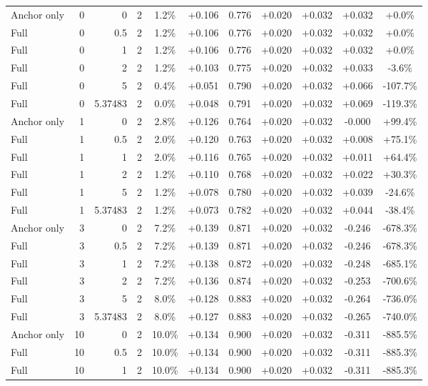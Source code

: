 \begin{table}[htbp]
\begin{tabular}{lrrrccccccc}
Anchor only & 0 & 0 & 2 & 1.2\% & +0.106 & 0.776 & +0.020 & +0.032 & +0.032 & +0.0\% \\
Full & 0 & 0.5 & 2 & 1.2\% & +0.106 & 0.776 & +0.020 & +0.032 & +0.032 & +0.0\% \\
Full & 0 & 1 & 2 & 1.2\% & +0.106 & 0.776 & +0.020 & +0.032 & +0.032 & +0.0\% \\
Full & 0 & 2 & 2 & 1.2\% & +0.103 & 0.775 & +0.020 & +0.032 & +0.033 & -3.6\% \\
Full & 0 & 5 & 2 & 0.4\% & +0.051 & 0.790 & +0.020 & +0.032 & +0.066 & -107.7\% \\
Full & 0 & 5.37483 & 2 & 0.0\% & +0.048 & 0.791 & +0.020 & +0.032 & +0.069 & -119.3\% \\
Anchor only & 1 & 0 & 2 & 2.8\% & +0.126 & 0.764 & +0.020 & +0.032 & -0.000 & +99.4\% \\
Full & 1 & 0.5 & 2 & 2.0\% & +0.120 & 0.763 & +0.020 & +0.032 & +0.008 & +75.1\% \\
Full & 1 & 1 & 2 & 2.0\% & +0.116 & 0.765 & +0.020 & +0.032 & +0.011 & +64.4\% \\
Full & 1 & 2 & 2 & 1.2\% & +0.110 & 0.768 & +0.020 & +0.032 & +0.022 & +30.3\% \\
Full & 1 & 5 & 2 & 1.2\% & +0.078 & 0.780 & +0.020 & +0.032 & +0.039 & -24.6\% \\
Full & 1 & 5.37483 & 2 & 1.2\% & +0.073 & 0.782 & +0.020 & +0.032 & +0.044 & -38.4\% \\
Anchor only & 3 & 0 & 2 & 7.2\% & +0.139 & 0.871 & +0.020 & +0.032 & -0.246 & -678.3\% \\
Full & 3 & 0.5 & 2 & 7.2\% & +0.139 & 0.871 & +0.020 & +0.032 & -0.246 & -678.3\% \\
Full & 3 & 1 & 2 & 7.2\% & +0.138 & 0.872 & +0.020 & +0.032 & -0.248 & -685.1\% \\
Full & 3 & 2 & 2 & 7.2\% & +0.136 & 0.874 & +0.020 & +0.032 & -0.253 & -700.6\% \\
Full & 3 & 5 & 2 & 8.0\% & +0.128 & 0.883 & +0.020 & +0.032 & -0.264 & -736.0\% \\
Full & 3 & 5.37483 & 2 & 8.0\% & +0.127 & 0.883 & +0.020 & +0.032 & -0.265 & -740.0\% \\
Anchor only & 10 & 0 & 2 & 10.0\% & +0.134 & 0.900 & +0.020 & +0.032 & -0.311 & -885.5\% \\
Full & 10 & 0.5 & 2 & 10.0\% & +0.134 & 0.900 & +0.020 & +0.032 & -0.311 & -885.3\% \\
Full & 10 & 1 & 2 & 10.0\% & +0.134 & 0.900 & +0.020 & +0.032 & -0.311 & -885.3\% \\

\end{tabular}
\end{table}
